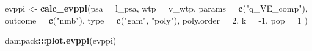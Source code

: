 \documentclass[
]{article}
\newenvironment{Shaded}{\begin{snugshade}}{\end{snugshade}}
\newcommand{\DataTypeTok}[1]{\textcolor[rgb]{0.13,0.29,0.53}{#1}}
\newcommand{\DecValTok}[1]{\textcolor[rgb]{0.00,0.00,0.81}{#1}}
\newcommand{\KeywordTok}[1]{\textcolor[rgb]{0.13,0.29,0.53}{\textbf{#1}}}
\newcommand{\NormalTok}[1]{#1}
\newcommand{\OperatorTok}[1]{\textcolor[rgb]{0.81,0.36,0.00}{\textbf{#1}}}
\newcommand{\StringTok}[1]{\textcolor[rgb]{0.31,0.60,0.02}{#1}}
\begin{document}
\begin{Shaded}
\begin{Highlighting}[]
\NormalTok{evppi <-}\StringTok{ }\KeywordTok{calc_evppi}\NormalTok{(}\DataTypeTok{psa =}\NormalTok{ l_psa, }
                    \DataTypeTok{wtp =}\NormalTok{ v_wtp, }
                    \DataTypeTok{params =} \KeywordTok{c}\NormalTok{(}\StringTok{"q_VE_comp"}\NormalTok{), }
                    \DataTypeTok{outcome =} \KeywordTok{c}\NormalTok{(}\StringTok{"nmb"}\NormalTok{),}
                    \DataTypeTok{type =} \KeywordTok{c}\NormalTok{(}\StringTok{"gam"}\NormalTok{, }\StringTok{"poly"}\NormalTok{),}
                    \DataTypeTok{poly.order =} \DecValTok{2}\NormalTok{,}
                    \DataTypeTok{k =} \DecValTok{-1}\NormalTok{,}
                    \DataTypeTok{pop =} \DecValTok{1}
\NormalTok{)}

\NormalTok{dampack}\OperatorTok{:::}\KeywordTok{plot.evppi}\NormalTok{(evppi)}
\end{Highlighting}
\end{Shaded}
\end{document}
